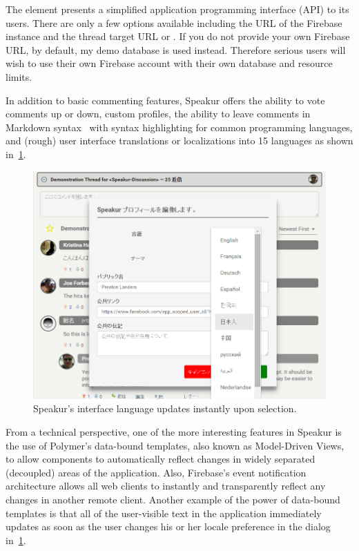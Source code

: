 The  element presents a simplified application programming interface (API) to its users.
There are only a few options available including the URL of the Firebase instance and the thread target URL or .
If you do not provide your own Firebase URL, by default, my demo database is used instead.
Therefore serious users will wish to use their own Firebase account with their own database and resource limits.

In addition to basic commenting features, Speakur offers the ability to vote comments up or down, custom profiles, 
the ability to leave comments in Markdown syntax~\cite{githubcontributors2015} with syntax highlighting for common programming languages, 
and (rough) user interface translations  or localizations 
into 15 languages as shown in~\cref{f:lang}.

\begin{figure}[htb]
\centering
 \includegraphics[width=\textwidth]{images/screenshot_20150320_1923_lang.png}
\caption{Speakur's interface language updates instantly upon selection.}
\label{f:lang}
\end{figure}

From a technical perspective, one of the more interesting features in Speakur is the use of Polymer's data-bound templates, also known as Model-Driven Views, 
to allow components to automatically reflect changes in widely separated (decoupled) areas of the application.
Also, Firebase's event notification architecture allows all web clients to instantly and transparently reflect any changes in another remote client.
Another example of the power of data-bound templates is that all of the user-visible text in the application immediately updates as soon as the user changes his or her locale preference in the dialog in~\cref{f:lang}.

